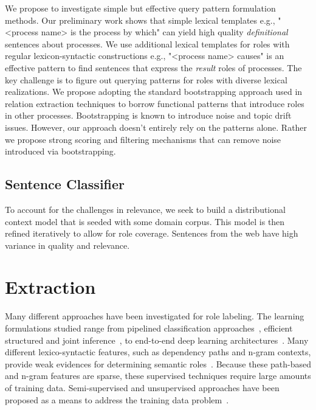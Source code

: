 We propose to investigate simple but effective query pattern formulation methods. 
Our preliminary work shows that simple lexical templates e.g., "<process name> is the process by which" can yield high quality {\em definitional} sentences about processes. 
We use additional lexical templates for roles with regular lexicon-syntactic constructions e.g., "<process name> causes" is an effective pattern to find sentences that express the {\em result} roles of processes. The key challenge is to figure out querying patterns for roles with diverse lexical realizations. We propose adopting the standard bootstrapping approach used in relation extraction techniques to borrow functional patterns that introduce roles in other processes. Bootstrapping is known to introduce noise and topic drift issues. However, our approach doesn't entirely rely on the patterns alone. Rather we propose strong scoring and filtering mechanisms that can remove noise introduced via bootstrapping.
\subsection{Sentence Classifier}

To account for the challenges in relevance, we seek to build a distributional context model that is seeded with some domain corpus. This model is then refined iteratively to allow for role coverage. 
Sentences from the web have high variance in quality and relevance. 

\section{Extraction}

Many different approaches have been investigated for role labeling.
The learning formulations studied range from pipelined classification approaches~\cite{gildea2002automatic,bjorkelund2009multilingual}, 
efficient structured and joint inference~\cite{koomen2005generalized,tackstrom2015efficient}, to end-to-end deep learning architectures~\cite{foland2015dependency}.
Many different lexico-syntactic features, such as dependency paths and n-gram contexts, provide weak evidences for determining semantic roles~\cite{gildea2002automatic}. 
Because these path-based and n-gram features are sparse, these supervised techniques require large amounts of training data. 
Semi-supervised and unsupervised approaches have been proposed as a means to address the training data problem~\cite{furstenau-emnlp2009,klementievsemi}.

